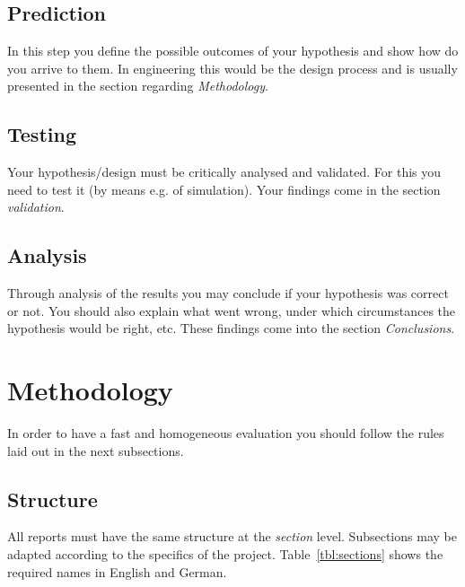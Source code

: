 	\subsection{Prediction}
	
	In this step you define the possible outcomes of your hypothesis and show how do you arrive to them. In engineering this would be the design process and is usually presented in the section regarding \emph{Methodology}.
	
	\subsection{Testing}
	
	Your hypothesis/design must be critically analysed and validated. For this you need to test it (by means e.g. of simulation). Your findings come in the section \emph{validation}.
	
	\subsection{Analysis}
	
	Through analysis of the results you may conclude if your hypothesis was correct or not. You should also explain what went wrong, under which circumstances the hypothesis would be right, etc. These findings come into the section \emph{Conclusions}.
	
	\section{Methodology} 
	
	In order to have a fast and homogeneous evaluation you should follow the rules laid out in the next subsections.
	
	\subsection{Structure}
	
	All reports must have the same structure at the \emph{section} level. Subsections may be adapted according to the specifics of the project. Table~\ref{tbl:sections} shows the required names in English and German.
	
